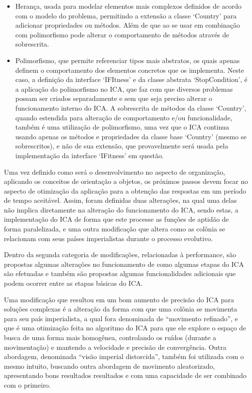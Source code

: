 \begin{itemize}
\item Herança, usada para modelar elementos mais complexos definidos de acordo com o modelo do problema, permitindo a extensão a classe ‘Country’ para adicionar propriedades ou métodos. Além de que ao se usar em combinação com polimorfismo pode alterar o comportamento de métodos através de sobrescrita.

\item Polimorfismo, que permite referenciar tipos mais abstratos, os quais apenas definem o comportamento dos elementos concretos que os implementa. Neste caso, a definição da interface ‘IFItness’ e da classe abstrata ‘StopCondition’, é a aplicação do polimorfismo no ICA, que faz com que diversos problemas possam ser criados separadamente e sem que seja preciso alterar o funcionamento interno do  ICA.
A sobrescrita de métodos da classe ‘Country’, quando estendida para alteração de comportamento e/ou funcionalidade, também é uma utilização de polimorfismo, uma vez que o ICA continua usando apenas os métodos e propriedades da classe base ‘Country’ (mesmo se sobrescritos), e não de sua extensão, que provavelmente será usada pela implementação da interface ‘IFitness’ em questão.
\end{itemize}

Uma vez definido como será o desenvolvimento no aspecto de organização, aplicando os conceitos de orientação a objetos, os próximos passos devem focar no aspecto de otimização da aplicação para a obtenção das respostas em um período de tempo aceitável. Assim, foram definidas duas alterações, na qual uma delas não implica diretamente na alteração do funcionamento do ICA, sendo estas, a implementação do ICA de forma que este processe as funções de aptidão de forma paralelizada, e uma outra modificação que altera como as colônia se relacionam com seus países imperialistas durante o processo evolutivo.

Dentro da segunda categoria de  modificações, relacionadas à performance, são propostas algumas alterações no funcionamento de como algumas etapas do ICA são efetuadas e também são propostas algumas funcionalidades adicionais que podem ocorrer entre as etapas básicas do ICA.

Uma modificação que resultou em um bom aumento de precisão do ICA para soluções complexas é a alteração da forma com que uma colônia se movimenta para seu país imperialista, a qual fora denominada de “movimento refinado”, e que é uma otimização feita no algoritmo do ICA para que ele explore o espaço de busca de uma forma mais homogênea, controlando os ruídos (durante a movimentação) e mantendo a velocidade e precisão de convergência. Outra abordagem, denominada “visão imperial distorcida”, também foi utilizada com o mesmo intuito, buscando outra abordagem de movimento aleatorizado, apresentando bons resultados resultados e com uma capacidade de ser combinado com o primeiro.

